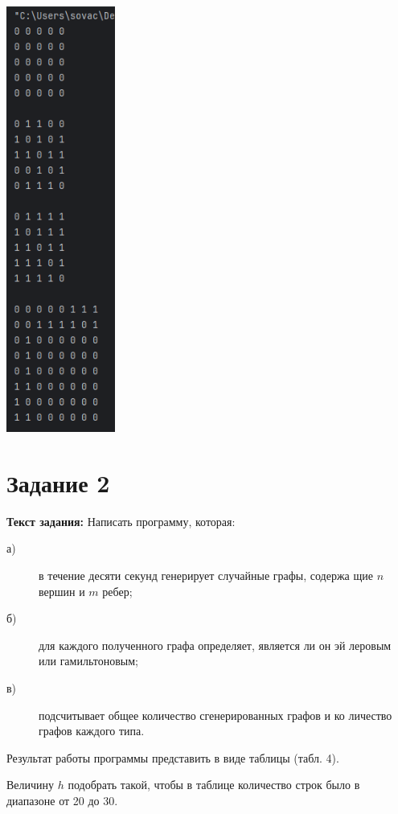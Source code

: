 \documentclass[12pt]{article}
\begin{document}
	\includegraphics[height=140mm]{images/random_graphs.png}
	
	\section{Задание 2}
	\label{task2}
	
	{\bf Текст задания:} Написать программу, которая:
	
	\begin{description}
	\item[а)] в течение десяти секунд генерирует случайные графы, содержа
	щие $n$ вершин и $m$ ребер; 
	
	\item[б)] для каждого полученного графа определяет, является ли он эй
	леровым или гамильтоновым; 
	
	\item[в)] подсчитывает общее количество сгенерированных графов и ко
	личество графов каждого типа.  
	\end{description}
	
	Результат работы программы представить в виде таблицы (табл. 4). 
	
	Величину $h$ подобрать такой, чтобы в таблице количество строк было в 
	диапазоне от 20 до 30. 
	
\end{document}
